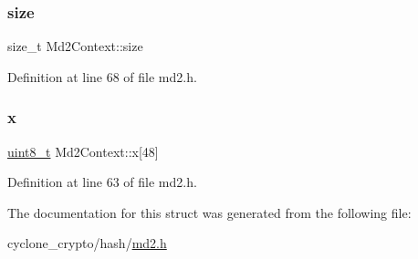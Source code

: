\subsubsection{\texorpdfstring{size}{size}}
{\footnotesize\ttfamily size\+\_\+t Md2\+Context\+::size}



Definition at line 68 of file md2.\+h.

\mbox{\label{structMd2Context_afea5eca1b34ddac53fa3f49846167bc4}} 
\subsubsection{\texorpdfstring{x}{x}}
{\footnotesize\ttfamily \hyperlink{stdint_8h_aba7bc1797add20fe3efdf37ced1182c5}{uint8\+\_\+t} Md2\+Context\+::x\mbox{[}48\mbox{]}}



Definition at line 63 of file md2.\+h.



The documentation for this struct was generated from the following file\+:\begin{DoxyCompactItemize}
\item 
cyclone\+\_\+crypto/hash/\hyperlink{md2_8h}{md2.\+h}\end{DoxyCompactItemize}
